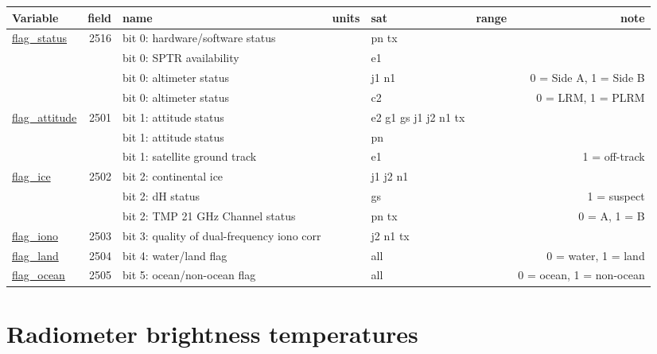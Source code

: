 \documentclass[a4paper,11pt,openany,natbib]{thesis}
\makeatletter
\newcommand\var[1]{\url{#1}\index{variables!#1@\protect\url{#1}}}
\newenvironment{vartable}{
\begin{table}[ht]
\small
\begin{tabular}{lrllllr}
\hline
Variable & field & name & units & sat & range & note \\
\hline
}{
\hline
\end{tabular}
\end{table}
}
\makeatother
\begin{document}
\begin{vartable}
\var{flag_status}   & 2516 & bit 0: hardware/software status & & pn tx & & \\
                    &      & bit 0: SPTR availability & & e1 & & \\
                    &      & bit 0: altimeter status & & j1 n1 & & 0 = Side A, 1 = Side B \\
                    &      & bit 0: altimeter status & & c2 & & 0 = LRM, 1 = PLRM \\
\var{flag_attitude} & 2501 & bit 1: attitude status & & e2 g1 gs j1 j2 n1 tx &  &\\
                    &      & bit 1: attitude status & & pn & & \\
                    &      & bit 1: satellite ground track & & e1 & & 1 = off-track \\
\var{flag_ice}      & 2502 & bit 2: continental ice & & j1 j2 n1 & & \\
                    &      & bit 2: dH status & & gs & & 1 = suspect \\       
                    &      & bit 2: TMP 21 GHz Channel status & & pn tx & & 0 = A, 1 = B \\
\var{flag_iono}     & 2503 & bit 3: quality of dual-frequency iono corr & & j2 n1 tx & & \\
\var{flag_land}     & 2504 & bit 4: water/land flag & & all & & 0 = water, 1 = land \\
\var{flag_ocean}    & 2505 & bit 5: ocean/non-ocean flag & & all & & 0 = ocean, 1 = non-ocean \\
\end{vartable}


\section{Radiometer brightness temperatures}
\label{var:tb}



\printindex
\end{document}
